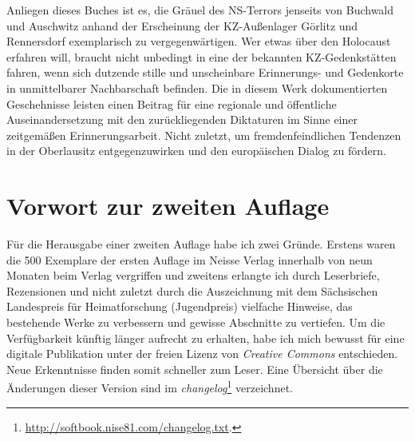 Anliegen dieses Buches ist es, die Gräuel des NS-Terrors jenseits von Buchwald und Auschwitz anhand der Erscheinung der KZ-Außenlager Görlitz und Rennersdorf exemplarisch zu vergegenwärtigen. Wer etwas über den Holocaust erfahren will, braucht nicht unbedingt in eine der bekannten KZ-Gedenkstätten fahren, wenn sich dutzende stille und unscheinbare Erinnerungs- und Gedenkorte in unmittelbarer Nachbarschaft befinden. Die in diesem Werk dokumentierten Geschehnisse leisten einen Beitrag für eine regionale und öffentliche Auseinandersetzung mit den zurückliegenden Diktaturen im Sinne einer zeitgemäßen Erinnerungsarbeit. Nicht zuletzt, um fremdenfeindlichen Tendenzen in der Oberlausitz entgegenzuwirken und den europäischen Dialog zu fördern.

\section*{Vorwort zur zweiten Auflage}
%
Für die Herausgabe einer zweiten Auflage habe ich zwei Gründe. Erstens waren die 500 Exemplare der ersten Auflage im Neisse Verlag innerhalb von neun Monaten beim Verlag vergriffen und zweitens erlangte ich durch Leserbriefe, Rezensionen und nicht zuletzt durch die Auszeichnung mit dem Sächsischen Landespreis für Heimatforschung (Jugendpreis) vielfache Hinweise, das bestehende Werke zu verbessern und gewisse Abschnitte zu vertiefen.
Um die Verfügbarkeit künftig länger aufrecht zu erhalten, habe ich mich bewusst für eine digitale Publikation unter der freien Lizenz von \emph{Creative Commons} entschieden. Neue Erkenntnisse finden somit schneller zum Leser. 
Eine Übersicht über die Änderungen dieser Version sind im \emph{changelog}\footnote{\url{http://softbook.nise81.com/changelog.txt}.} verzeichnet. 

